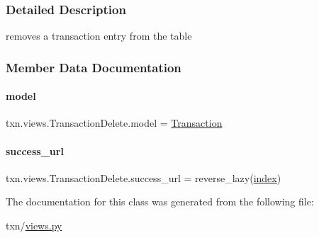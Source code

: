 \subsubsection{Detailed Description}
removes a transaction entry from the table 

\subsubsection{Member Data Documentation}
\mbox{\label{classtxn_1_1views_1_1TransactionDelete_a237c03b6720901284adfe618d0e34124}} 
\paragraph{\texorpdfstring{model}{model}}
{\footnotesize\ttfamily txn.\+views.\+Transaction\+Delete.\+model = \hyperlink{classtxn_1_1models_1_1Transaction}{Transaction}\hspace{0.3cm}{\ttfamily [static]}}

\mbox{\label{classtxn_1_1views_1_1TransactionDelete_abfde2acba072b8d8900971a288187634}} 
\paragraph{\texorpdfstring{success\+\_\+url}{success\_url}}
{\footnotesize\ttfamily txn.\+views.\+Transaction\+Delete.\+success\+\_\+url = reverse\+\_\+lazy(\textquotesingle{}\hyperlink{namespacetxn_1_1views_a61ce77e1acb7dff6d535eb5df692cc15}{index}\textquotesingle{})\hspace{0.3cm}{\ttfamily [static]}}



The documentation for this class was generated from the following file\+:\begin{DoxyCompactItemize}
\item 
txn/\hyperlink{txn_2views_8py}{views.\+py}\end{DoxyCompactItemize}
